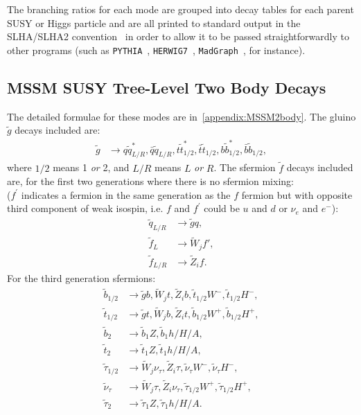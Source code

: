 \documentclass[final,3p,times]{elsarticle}
\def\code#1{{\tt #1}}
\begin{document}
The branching ratios for each mode are grouped into decay tables for each
parent SUSY or Higgs particle and are all printed to standard
output in the SLHA/SLHA2 convention~\cite{Skands:2003cj,Allanach:2008qq} in
order to allow it to be passed straightforwardly to other programs
(such as {\tt PYTHIA}~\cite{Sjostrand:2014zea},
\code{HERWIG7}~\cite{Bahr:2008pv}, {\tt MadGraph}~\cite{Alwall:2014}, for
instance).  


\subsection{MSSM SUSY Tree-Level Two Body Decays}
The detailed formulae for these modes are in~\ref{appendix:MSSM2body}.
The gluino $\tilde{g}$ decays included are:
\begin{align*}
\tilde{g} &\rightarrow q \tilde{q}_{L/R}^* , \bar{q} \tilde{q}_{L/R}, t \tilde{t}_{1/2}^*, \bar{t} \tilde{t}_{1/2},
b \tilde{b}_{1/2}^*, \bar{b} \tilde{b}_{1/2},
\end{align*}
where $1/2$ means 1 {\em or}\/ 2, and $L/R$ means $L$ {\em or} $R$.
The sfermion $\tilde{f}$ decays included are, for the first two generations
where there is no sfermion mixing: \\ ($f^{'}$ indicates a fermion in the same
generation as the $f$ fermion but with opposite third component of weak
isospin, i.e. $f$ and $f^{'}$ could be $u$ and $d$ or $\nu_{e}$ and $e^{-}$): 
\begin{align*}
\tilde{q}_{L/R} &\rightarrow \tilde{g} q, \\
\tilde{f}_{L} &\rightarrow \tilde{W}_{j} f', \\
\tilde{f}_{L/R} &\rightarrow \tilde{Z}_{i} f.
\end{align*}
For the third generation sfermions:
\begin{align*}
\tilde{b}_{1/2} &\rightarrow \tilde{g} b, \tilde{W}_{j} t, \tilde{Z}_{i} b, \tilde{t}_{1/2} W^-, \tilde{t}_{1/2} H^-, \\
\tilde{t}_{1/2} &\rightarrow \tilde{g} t, \tilde{W}_{j} b, \tilde{Z}_{i} t, \tilde{b}_{1/2} W^+, \tilde{b}_{1/2} H^+,\\
\tilde{b}_{2} &\rightarrow \tilde{b}_{1} Z, \tilde{b}_{1} h/H/A, \\
\tilde{t}_{2} &\rightarrow \tilde{t}_{1} Z, \tilde{t}_{1} h/H/A, \\
\tilde{\tau}_{1/2} &\rightarrow \tilde{W}_{j} \nu_{\tau}, \tilde{Z}_{i} \tau, \tilde{\nu}_{\tau} W^-, \tilde{\nu}_{\tau} H^-, \\
\tilde{\nu}_{\tau} &\rightarrow \tilde{W}_{j} \tau, \tilde{Z}_{i} \nu_{\tau},
                     \tilde{\tau}_{1/2} W^+, \tilde{\tau}_{1/2} H^+, \\
\tilde{\tau}_{2} &\rightarrow \tilde{\tau}_{1} Z, \tilde{\tau}_{1} h/H/A. 
\end{align*}
\end{document}
